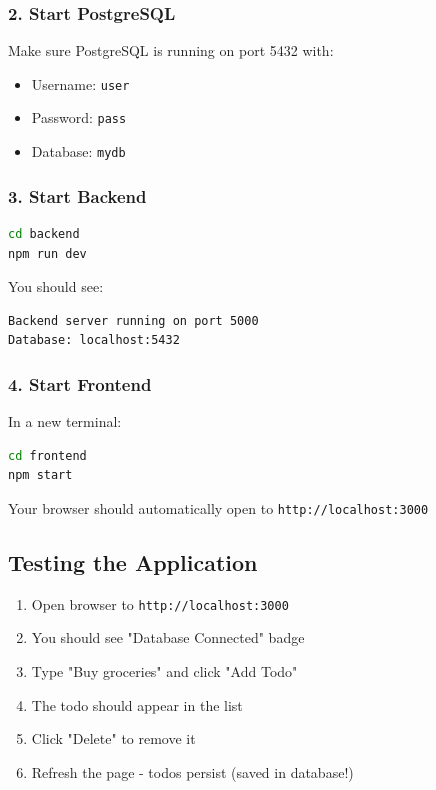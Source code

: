 \documentclass[12pt,a4paper]{article}
\begin{document}
\subsubsection{2. Start PostgreSQL}

Make sure PostgreSQL is running on port 5432 with:
\begin{itemize}
    \item Username: \texttt{user}
    \item Password: \texttt{pass}
    \item Database: \texttt{mydb}
\end{itemize}

\subsubsection{3. Start Backend}

\begin{lstlisting}[language=bash]
cd backend
npm run dev
\end{lstlisting}

You should see:
\begin{lstlisting}[numbers=none]
Backend server running on port 5000
Database: localhost:5432
\end{lstlisting}

\subsubsection{4. Start Frontend}

In a new terminal:
\begin{lstlisting}[language=bash]
cd frontend
npm start
\end{lstlisting}

Your browser should automatically open to \texttt{http://localhost:3000}

\subsection{Testing the Application}

\begin{enumerate}
    \item Open browser to \texttt{http://localhost:3000}
    \item You should see "Database Connected" badge
    \item Type "Buy groceries" and click "Add Todo"
    \item The todo should appear in the list
    \item Click "Delete" to remove it
    \item Refresh the page - todos persist (saved in database!)
\end{enumerate}
\end{document}
